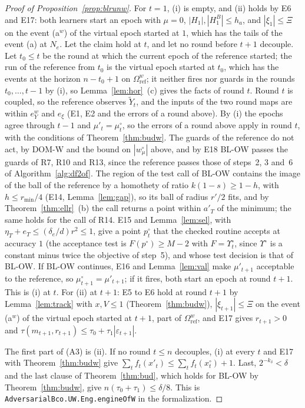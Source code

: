 \documentclass[11pt]{amsart}
\theoremstyle{definition}
\numberwithin{equation}{section}
\begin{document}
\begin{proof}[Proof of Proposition~\ref{prop:blrunw}]
For $t=1$, (i) is empty, and (ii) holds by E6 and E17: both learners start an epoch with $\mu=0$, $|H_1|,|H^B_1|\le h_a$, and $|\xi_1|\le\Xi$ on the event (a$^w$) of the virtual epoch started at $1$, which has the tails of the event (a) at $N_e$. Let the claim hold at $t$, and let no round before $t+1$ decouple. Let $t_0\le t$ be the round at which the current epoch of the reference started; the run of the reference from $t_0$ is the virtual epoch started at $t_0$, which has the events at the horizon $n-t_0+1$ on $\Omega^w_{\mathrm{ref}}$; it neither fires nor guards in the rounds $t_0,\dots,t-1$ by (i), so Lemma~\ref{lem:hor}~(c) gives the facts of round $t$. Round $t$ is coupled, so the reference observes $\tilde Y_t$, and the inputs of the two round maps are within $e^w_Y$ and $e_\xi$ (E1, E2 and the errors of a round above). By (i) the epochs agree through $t-1$ and $\mu'_t=\mu^\circ_t$, so the errors of a round above apply in round $t$, with the conditions of Theorem~\ref{thm:budw}. The guards of the reference do not act, by DOM-W and the bound on $|w^\circ_\mu|$ above, and by E18 BL-OW passes the guards of R7, R10 and R13, since the reference passes those of steps~2, 3 and~6 of Algorithm~\ref{alg:df2of}. The region of the test call of BL-OW contains the image of the ball of the reference by a homothety of ratio $k(1-s)\ge1-h$, with $h\le r_{\min}/4$ (E14, Lemma~\ref{lem:gap}), so its ball of radius $r'/2$ fits, and by Theorem~\ref{thm:ellr}~(b) the call returns a point within $a'_T$ of the minimum; the same holds for the call of R14. E15 and Lemma~\ref{lem:sel}, with $\eta_T+e_T\le(\delta_e/d)r^2\le1$, give a point $p^\circ_t$ that the checked routine accepts at accuracy $1$ (the acceptance test is $F(p^\circ)\ge M-2$ with $F=\Upsilon^\circ_t$, since $\Upsilon^\circ$ is a constant minus twice the objective of step~5), and whose test decision is that of BL-OW. If BL-OW continues, E16 and Lemma~\ref{lem:val} make $\mu'_{t+1}$ acceptable to the reference, so $\mu^\circ_{t+1}=\mu'_{t+1}$; if it fires, both start an epoch at round $t+1$. This is (i) at $t$. For (ii) at $t+1$: E5 to E6 hold at round $t+1$ by Lemma~\ref{lem:track} with $x,V\le1$ (Theorem~\ref{thm:budw}), $|\xi_{t+1}|\le\Xi$ on the event (a$^w$) of the virtual epoch started at $t+1$, part of $\Omega^w_{\mathrm{ref}}$, and E17 gives $r_{t+1}>0$ and $\tau(m_{t+1},r_{t+1})\le\tau_0+\tau_1|\varepsilon_{t+1}|$.

The first part of (A3) is (ii). If no round $t\le n$ decouples, (i) at every $t$ and E17 with Theorem~\ref{thm:budw} give $\sum_tf_t(x'_t)\le\sum_tf_t(x^\circ_t)+1$. Last, $2^{-k_\delta}<\delta$ and the last clause of Theorem~\ref{thm:bud}, which holds for BL-OW by Theorem~\ref{thm:budw}, give $n(\tau_0+\tau_1)\le\delta/8$. This is \texttt{AdversarialBco.UW.Eng.engineOfW} in the formalization.
\end{proof}
\end{document}
